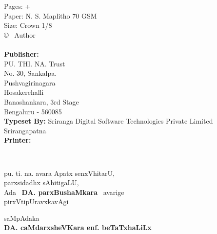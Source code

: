 \noindent
{\eng\fontsize{10}{12}\selectfont 
Pages: \pageref{prelims:end} + \pageref{book:end}\\[3pt]
Paper: N. S. Maplitho 70 GSM\\
Size: Crown 1/8\\[3pt]
\copyright~ Author\\[30pt]
\rupee \\[30pt]
{\eng\bfseries Publisher:}\\ 
PU. THI. NA. Trust\\
No. 30, Sankalpa.\\
Pushvagirinagara\\
Hosakerehalli\\
Banashankara, 3rd Stage\\
Bengaluru - 560085\\[15pt]
{\eng\bfseries Typeset By:} Sriranga Digital Software Technologies Private Limited\\
Srirangapatna\\[15pt]
{\eng\bfseries Printer:}}

\newpage

\thispagestyle{empty}
~\phantom{a}

\vfill

\begin{minipage}[c]{8cm}
\begin{center}
pu. ti. na. avara Apatx senxVhitarU,\\[3pt]
parxsidadhx sAhitigaLU,\\[3pt]
Ada~ {\large\bf DA. parxBushaMkara}~ avarige\\[3pt]
pirxVtipUravxkavAgi
\end{center}

\bigskip

\begin{flushright}
saMpAdaka\hspace{1.2cm}\,\\[3pt]
{\bf DA. caMdarxsheVKara enf. beTaTxhaLiLx}
\end{flushright}
\end{minipage}

\vfill\eject

\thispagestyle{empty}
~\phantom{a}


